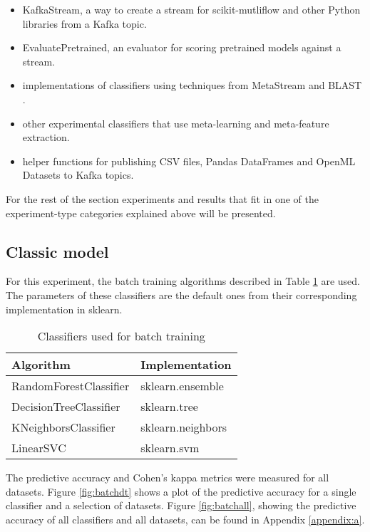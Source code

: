 \documentclass{sig-alternate-br}
\begin{document}
\begin{itemize}
    \item KafkaStream, a way to create a stream for scikit-mutliflow and other Python libraries from a Kafka topic.
    \item EvaluatePretrained, an evaluator for scoring pretrained models against a stream.
    \item implementations of classifiers using techniques from MetaStream \cite{rossi2014metastream} and BLAST \cite{van2018online}.
    \item other experimental classifiers that use meta-learning and meta-feature extraction.
    \item helper functions for publishing CSV files, Pandas DataFrames and OpenML Datasets to Kafka topics.
\end{itemize}

For the rest of the section experiments and results that fit in one of the experiment-type categories explained above will be presented.

\subsection{Classic model}

For this experiment, the batch training algorithms described in Table \ref{table:batch_algos} are used. The parameters of these classifiers are the default ones from their corresponding implementation in sklearn. 

\begin{table}[h]
\centering
\renewcommand{\arraystretch}{1.25}
\begin{tabular}{|l|l|} \hline
\textbf{Algorithm} & \textbf{Implementation}\\ \hline
RandomForestClassifier & sklearn.ensemble \\ \hline
DecisionTreeClassifier & sklearn.tree \\ \hline
KNeighborsClassifier & sklearn.neighbors \\ \hline
LinearSVC & sklearn.svm \\ \hline
\end{tabular}
\caption{Classifiers used for batch training}
\label{table:batch_algos}
\end{table}

The predictive accuracy and Cohen's kappa metrics were measured for all datasets. Figure \ref{fig:batchdt} shows a plot of the predictive accuracy for a single classifier and a selection of datasets. Figure \ref{fig:batchall}, showing the predictive accuracy of all classifiers and all datasets, can be found in Appendix \ref{appendix:a}.
\end{document}
